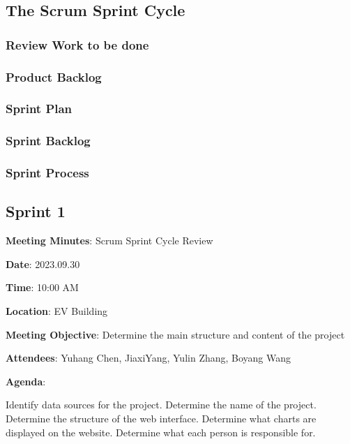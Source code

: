 \documentclass[conference]{IEEEtran}
\begin{document}
\subsection{\textbf{The Scrum Sprint Cycle}}

\subsubsection{\textbf{Review Work to be done}}


\subsubsection{\textbf{Product Backlog}}

\subsubsection{\textbf{Sprint Plan}}



\subsubsection{\textbf{Sprint Backlog}}

\subsubsection{\textbf{Sprint Process}}

\textbf{}

\subsection*{Sprint 1}

\textbf{Meeting Minutes}: Scrum Sprint Cycle Review

\textbf{Date}: 2023.09.30

\textbf{Time}: 10:00 AM

\textbf{Location}: EV Building

\textbf{Meeting Objective}: Determine the main structure and content of the project

\textbf{Attendees}:
Yuhang Chen, JiaxiYang, Yulin Zhang, Boyang Wang

\textbf{Agenda}:

Identify data sources for the project.
Determine the name of the project.
Determine the structure of the web interface.
Determine what charts are displayed on the website.
Determine what each person is responsible for.
\end{document}
